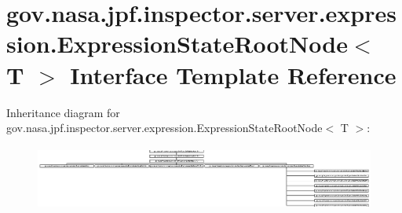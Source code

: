 \hypertarget{interfacegov_1_1nasa_1_1jpf_1_1inspector_1_1server_1_1expression_1_1_expression_state_root_node}{}\section{gov.\+nasa.\+jpf.\+inspector.\+server.\+expression.\+Expression\+State\+Root\+Node$<$ T $>$ Interface Template Reference}
\label{interfacegov_1_1nasa_1_1jpf_1_1inspector_1_1server_1_1expression_1_1_expression_state_root_node}
Inheritance diagram for gov.\+nasa.\+jpf.\+inspector.\+server.\+expression.\+Expression\+State\+Root\+Node$<$ T $>$\+:\begin{figure}[H]
\begin{center}
\leavevmode
\includegraphics[height=2.121212cm]{interfacegov_1_1nasa_1_1jpf_1_1inspector_1_1server_1_1expression_1_1_expression_state_root_node}
\end{center}
\end{figure}
